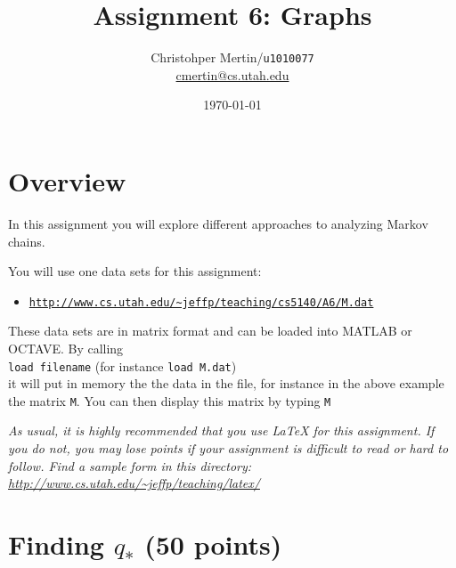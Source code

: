 \documentclass[11pt]{article}
\title{Assignment 6: Graphs}
\author{Christohper Mertin/\verb~u1010077~\\
        \url{cmertin@cs.utah.edu}}
\date{\today}
\begin{document}
\maketitle





\section*{Overview}

In this assignment you will explore different approaches to analyzing Markov chains.  

You will use one data sets for this assignment:
\begin{itemize} \denselist
\item \href{http://www.cs.utah.edu/~jeffp/teaching/cs5140/A6/M.dat}{\texttt{http://www.cs.utah.edu/\~{}jeffp/teaching/cs5140/A6/M.dat}}
\end{itemize}
These data sets are in matrix format and can be loaded into MATLAB or OCTAVE.  By calling 
\\
\texttt{load filename} (for instance \texttt{load M.dat})
\\
it will put in memory the the data in the file, for instance in the above example the matrix \texttt{M}.  You can then display this matrix by typing 
\texttt{M}

\vspace{.1in}

\emph{As usual, it is highly recommended that you use LaTeX for this assignment.  If you do not, you may lose points if your assignment is difficult to read or hard to follow.  Find a sample form in this directory:
\url{http://www.cs.utah.edu/~jeffp/teaching/latex/}}


\section{Finding $q_*$ (50 points)}
\end{document}
